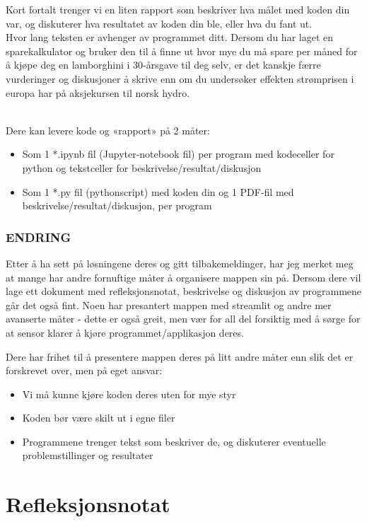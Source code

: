 \documentclass[12pt, titlepage]{article}
\begin{document}
Kort fortalt trenger vi en liten rapport som beskriver hva målet med koden din var, og diskuterer hva resultatet av koden din ble, eller hva du fant ut.\\
Hvor lang teksten er avhenger av programmet ditt. 
Dersom du har laget en sparekalkulator og bruker den til å finne ut hvor mye du må spare per måned for å kjøpe deg en lamborghini i 30-årsgave til deg selv, er det kanskje færre vurderinger og diskusjoner å skrive enn om du undersøker effekten strømprisen i europa har på aksjekursen til norsk hydro.

~\\
Dere kan  levere kode og «rapport» på 2 måter:
\begin{itemize}
   \item {Som 1 *.ipynb fil (Jupyter-notebook fil) per program med kodeceller for python og tekstceller for beskrivelse/resultat/diskusjon}
   \item {Som 1 *.py fil (pythonscript) med koden din og 1 PDF-fil med beskrivelse/resultat/diskusjon, per program}
\end{itemize}

\color{blue}
\subsubsection*{ENDRING}
Etter å ha sett på løsningene deres og gitt tilbakemeldinger, har jeg merket meg at mange har andre fornuftige måter å organisere mappen sin på.
Dersom dere vil lage ett dokument med refleksjonsnotat,  beskrivelse og diskusjon av programmene går det også fint.
Noen har presantert mappen med streamlit og andre mer avanserte måter - dette er også greit, men vær for all del forsiktig med å sørge for at sensor klarer å kjøre programmet/applikasjon deres.

Dere har frihet til å presentere mappen deres på litt andre måter enn slik det er forskrevet over, men på eget ansvar:
\begin{itemize}
   \item {Vi må kunne kjøre koden deres uten for mye styr}
   \item {Koden bør være skilt ut i egne filer}
   \item {Programmene trenger tekst som beskriver de, og diskuterer eventuelle problemstillinger og resultater}
\end{itemize}

\color{black}


\section*{Refleksjonsnotat}
\end{document}
